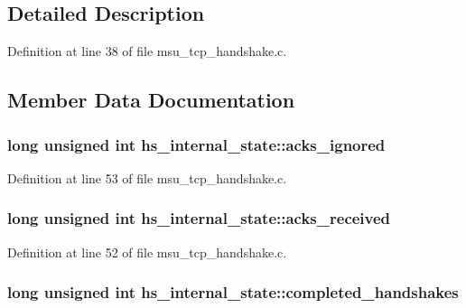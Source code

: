 \subsection{Detailed Description}


Definition at line 38 of file msu\-\_\-tcp\-\_\-handshake.\-c.



\subsection{Member Data Documentation}
\hypertarget{strucths__internal__state_a3a25f96509f9745e82485dc5157cce76}{
\subsubsection[{acks\-\_\-ignored}]{\setlength{\rightskip}{0pt plus 5cm}long unsigned int hs\-\_\-internal\-\_\-state\-::acks\-\_\-ignored}}\label{strucths__internal__state_a3a25f96509f9745e82485dc5157cce76}


Definition at line 53 of file msu\-\_\-tcp\-\_\-handshake.\-c.

\hypertarget{strucths__internal__state_a894f19005fc57a38515718b01e1f16d6}{
\subsubsection[{acks\-\_\-received}]{\setlength{\rightskip}{0pt plus 5cm}long unsigned int hs\-\_\-internal\-\_\-state\-::acks\-\_\-received}}\label{strucths__internal__state_a894f19005fc57a38515718b01e1f16d6}


Definition at line 52 of file msu\-\_\-tcp\-\_\-handshake.\-c.

\hypertarget{strucths__internal__state_a2bb7bdfb44554fc23bdac6abd910dee5}{
\subsubsection[{completed\-\_\-handshakes}]{\setlength{\rightskip}{0pt plus 5cm}long unsigned int hs\-\_\-internal\-\_\-state\-::completed\-\_\-handshakes}}\label{strucths__internal__state_a2bb7bdfb44554fc23bdac6abd910dee5}


